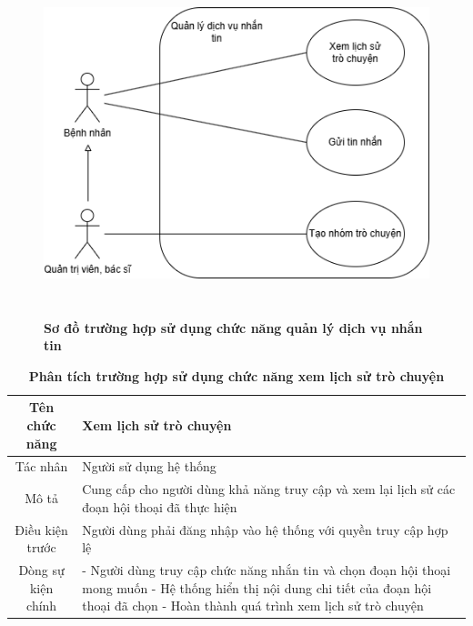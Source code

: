 \begin{figure}[H]
	\centering
	\includegraphics[width=12cm,height=10cm]{Images/use_case/use_case_chat.png}
	\caption[Sơ đồ trường hợp sử dụng chức năng quản lý dịch vụ nhắn tin]{\bfseries \fontsize{12pt}{0pt}
		\selectfont Sơ đồ trường hợp sử dụng chức năng quản lý dịch vụ nhắn tin}
	\label{use_case_chat} %
\end{figure}

\begin{table}[H]
	\caption{\bfseries \fontsize{12pt}{0pt}\selectfont Phân tích trường hợp sử dụng chức năng xem lịch sử trò chuyện}
	\centering
	\begin{tabularx}{0.9\textwidth}{|c|X|}
		\hline
		\textbf{Tên chức năng} & \textbf{Xem lịch sử trò chuyện}                                                              \\
		\hline
		Tác nhân               & Người sử dụng hệ thống                                                                       \\
		\hline
		Mô tả                  & Cung cấp cho người dùng khả năng truy cập và xem lại lịch sử các đoạn hội thoại đã thực hiện \\
		\hline
		Điều kiện trước        & Người dùng phải đăng nhập vào hệ thống với quyền truy cập hợp lệ                             \\
		\hline
		Dòng sự kiện chính     &
		- Người dùng truy cập chức năng nhắn tin và chọn đoạn hội thoại mong muốn \newline
		- Hệ thống hiển thị nội dung chi tiết của đoạn hội thoại đã chọn \newline
		- Hoàn thành quá trình xem lịch sử trò chuyện                                                                         \\
		\hline
	\end{tabularx}
\end{table}

